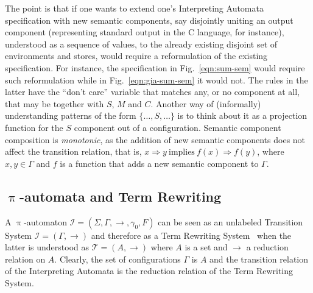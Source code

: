 \documentclass{llncs}%
\begin{document}
The point is that if one wants to extend one's Interpreting Automata specification with new
semantic components, say disjointly uniting an output component (representing standard output in the C language, for instance), understood as a
sequence of values, to the already existing disjoint set of
environments and stores, would require a reformulation of the existing
specification. For instance, the specification in
Fig.~\ref{eqn:sum-sem} would require such reformulation while in
Fig.~\ref{eqn:gia-sum-sem} it would not. The rules in the latter have
the ``don't care'' variable that matches any, or no component at all,
that may be together with $S$, $M$ and $C$. Another way of
(informally) understanding patterns of the form $\{\ldots, S,
\ldots\}$ is to think about it as a projection function for the $S$
component out of a configuration.  Semantic component
composition is \emph{monotonic}, as the addition of new semantic
components does not affect the transition relation, that is, $x
\Rightarrow y ~\mbox{implies}~ f(x) \Rightarrow f(y)$, where $x, y \in \Gamma$
and $f$ is a function that adds a new semantic component to $\Gamma$.
%

     
\subsection{$\uppi$-automata and Term Rewriting}\label{sec:gia-and-trs}

A $\uppi$-automaton $\mathcal{I} = (\Sigma, \Gamma, \rightarrow, \gamma_0, F)$ 
can be seen as an unlabeled Transition System $\mathcal{I} = (\Gamma, \rightarrow)$ and therefore  
as a Term Rewriting
System~\cite{Baader:1998:TR:280474} when the latter is understood as
$\mathcal{T} = (A, \longrightarrow)$ where $A$ is a set and $\longrightarrow$ a
reduction relation on $A$. Clearly, the set of configurations $\Gamma$ is $A$
and the transition relation of the Interpreting Automata is the
reduction relation of the Term Rewriting System.
\end{document}
